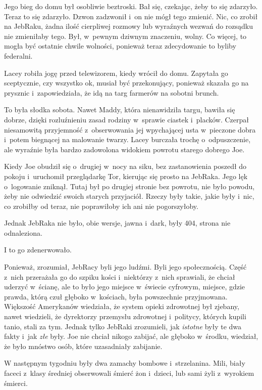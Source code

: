\documentclass[oneside,polish,11pt,sfheadings]{mwbk}
\begin{document}
Jego bieg do domu był osobliwie beztroski. Bał się, czekając, żeby to
się zdarzyło. Teraz to się zdarzyło. Dzwon zadzwonił i~on nie mógł tego
zmienić. Nic, co zrobił na JebRaku, żadna ilość cierpliwej rozmowy lub
wyraźnych wezwań do rozsądku nie zmieniłaby tego. Był, w~pewnym dziwnym
znaczeniu, wolny. Co więcej, to mogła być ostatnie chwile wolności,
ponieważ teraz zdecydowanie to byliby federalni.

Lacey robiła jogę przed telewizorem, kiedy wrócił do domu. Zapytała go
sceptycznie, czy wszystko ok, musiał być przekonujący, ponieważ skazała
go na prysznic i~zapowiedziała, że idą na targ farmerów na sobotni
brunch.

To była słodka sobota. Nawet Maddy, która nienawidziła targu, bawiła się
dobrze, dzięki rozluźnieniu zasad rodziny w~sprawie ciastek i~placków.
Czerpał niesamowitą przyjemność z~obserwowania jej wpychającej usta w~pieczone dobra i~potem biegnącej na malowanie twarzy. Lacey burczała
trochę o~odpuszczenie, ale wyraźnie była bardzo zadowolona widokiem
powrotu starego dobrego Joe.

Kiedy Joe obudził się o~drugiej w~nocy na siku, bez zastanowienia
poszedł do pokoju i~uruchomił przeglądarkę Tor, kierując się prosto na
JebRaka. Jego lęk o~logowanie zniknął. Tutaj był po drugiej stronie bez
powrotu, nie było powodu, żeby nie odwiedzić swoich starych przyjaciół.
Rzeczy były takie, jakie były i~nic, co zrobiłby od teraz, nie
poprawiłoby ich ani nie pogorszyłoby.

Jednak JebRaka nie było, obie wersje, jawna i~dark, były 404, strona nie
odnaleziona.

I to go zdenerwowało.

Ponieważ, zrozumiał, JebRacy byli jego ludźmi. Byli jego społecznością.
Część z~nich przerażała go do szpiku kości i~niektórzy z~nich sprawiali,
że chciał uderzyć w~ścianę, ale to było jego miejsce w~świecie cyfrowym,
miejsce, gdzie prawda, którą czuł głęboko w~kościach, była powszechnie
przyjmowana. Większość Amerykanów wiedziała, że system opieki zdrowotnej
był zjebany, nawet wiedzieli, że dyrektorzy przemysłu zdrowotnej i~politycy, których kupili tanio, stali za tym. Jednak tylko JebRaki
zrozumieli, jak \textit{istotne }były te dwa fakty i~jak \textit{złe} były.
Joe nie chciał nikogo zabijać, ale głęboko w~środku, wiedział, że było
mnóstwo osób, które uzasadniały zabijanie.

W następnym tygodniu były dwa zamachy bombowe i~strzelanina. Mili, biały
faceci z~klasy średniej obserwowali śmierć żon i~dzieci, lub sami żyli z~wyrokiem śmierci.
\end{document}
